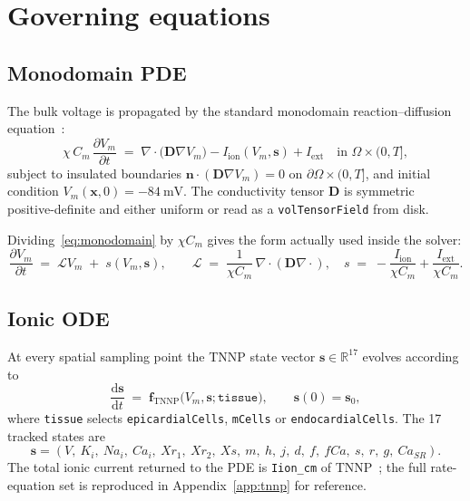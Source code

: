 \documentclass[11pt,a4paper]{article}
\newcommand{\Vm}{V_{m}}
\newcommand{\Iion}{I_{\text{ion}}}
\newcommand{\Iext}{I_{\text{ext}}}
\newcommand{\Dten}{\mathbf{D}}
\newcommand{\grad}{\nabla}
\newcommand{\divg}{\nabla\!\cdot}
\newcommand{\code}[1]{\texttt{\small #1}}
\begin{document}
\section{Governing equations}

\subsection{Monodomain PDE}

The bulk voltage is propagated by the standard monodomain
reaction--diffusion equation~\cite{ttp2004,niederer2012}:
\begin{equation}
  \chi \, C_{m} \, \frac{\partial \Vm}{\partial t}
   \;=\;
   \divg\!\bigl( \Dten \grad \Vm \bigr)
   - \Iion(\Vm, \mathbf{s})
   + \Iext
   \quad \text{in } \Omega \times (0, T],
   \label{eq:monodomain}
\end{equation}
subject to insulated boundaries
$\mathbf{n} \cdot ( \Dten \grad \Vm ) = 0$ on
$\partial \Omega \times (0, T]$, and initial condition
$\Vm(\mathbf{x}, 0) = -\SI{84}{\milli\volt}$. The conductivity tensor
$\Dten$ is symmetric positive-definite and either uniform or read as a
\code{volTensorField} from disk.

Dividing~\eqref{eq:monodomain} by $\chi C_{m}$ gives the form actually
used inside the solver:
\begin{equation}
  \frac{\partial \Vm}{\partial t}
   \;=\;
   \mathcal{L} \Vm
   \;+\;
   s(\Vm, \mathbf{s}),
   \qquad
   \mathcal{L} \;=\; \frac{1}{\chi C_{m}}\,\divg(\Dten \grad \cdot),
   \quad
   s \;=\; -\frac{\Iion}{\chi C_{m}} + \frac{\Iext}{\chi C_{m}}.
   \label{eq:semi-discrete}
\end{equation}

\subsection{Ionic ODE}

At every spatial sampling point the TNNP state vector
$\mathbf{s} \in \mathbb{R}^{17}$ evolves according to
\begin{equation}
  \frac{\mathrm{d}\mathbf{s}}{\mathrm{d}t}
   \;=\;
   \mathbf{f}_{\text{TNNP}}\!\bigl(\Vm, \mathbf{s}; \texttt{tissue}\bigr),
   \qquad \mathbf{s}(0) = \mathbf{s}_{0},
   \label{eq:tnnp}
\end{equation}
where \code{tissue} selects \code{epicardialCells}, \code{mCells} or
\code{endocardialCells}. The 17 tracked states are
\[
  \mathbf{s} = (V,\ K_{i},\ Na_{i},\ Ca_{i},\ Xr_{1},\ Xr_{2},\ Xs,\ m,\ h,\ j,\ d,\ f,\ fCa,\ s,\ r,\ g,\ Ca_{SR}).
\]
The total ionic current returned to the PDE is \code{Iion\_cm} of
TNNP~\cite{ttp2004}; the full rate-equation set is reproduced in
Appendix~\ref{app:tnnp} for reference.
\end{document}
